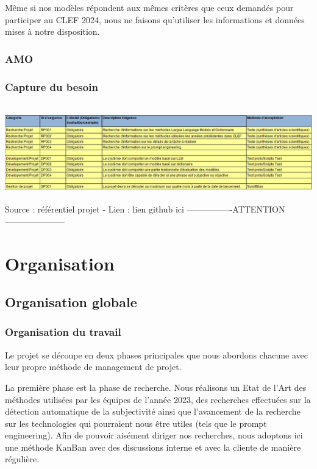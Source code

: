 \documentclass[11pt]{rapport_class}
\begin{document}
Même si nos modèles répondent aux mêmes critères que ceux demandés pour participer au CLEF 2024, nous ne faisons qu'utiliser les informations et données mises à notre disposition.


\subsection{AMO}

\subsection{Capture du besoin}
\begin{center}
\includegraphics[height=4.2cm]{capture_besoin.png}\\
\tiny
 Source : référentiel projet - Lien : lien github ici ----------------ATTENTION---------------------
\end{center}

\chapter{Organisation}
\section{Organisation globale}

\subsection{Organisation du travail}
\qquad Le projet se découpe en deux phases principales que nous abordons chacune avec leur propre méthode de management de projet.

La première phase est la phase de recherche. Nous réalisons un Etat de l'Art des méthodes utilisées par les équipes de l'année 2023, des recherches effectuées sur la détection automatique de la subjectivité ainsi que l'avancement de la recherche sur les technologies qui pourraient nous être utiles (tels que le prompt engineering). Afin de pouvoir aisément diriger nos recherches, nous adoptons ici une méthode KanBan avec des discussions interne et avec la cliente de manière régulière.
\end{document}

